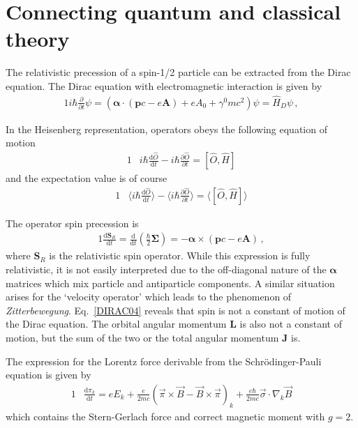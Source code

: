 \section{Connecting quantum and classical theory}
\label{sec:ehrenfest}
\noindent The relativistic precession of a spin-1/2 particle can be extracted from the Dirac equation. The Dirac equation with electromagnetic interaction is given by
\begin{alignat}{1}
  \label{DIRAC01} i\hbar\frac{\partial}{\partial t}\psi=\left(\boldsymbol{\alpha}\cdot\left(\mathbf{p}c-e\mathbf{A}\right)+eA_{0}+\gamma^{0}mc^{2}\right)\psi=\hat{H}_{D}\psi\,,
\end{alignat}

In the Heisenberg representation, operators obeys the following equation of motion
\begin{alignat}{1}
  \label{m06}		&i\hbar\frac{\mathrm{d}\hat{O}}{\mathrm{d}t}-i\hbar\frac{\partial\hat{O}}{\partial t}=[\hat{O},\hat{H}]
\end{alignat}
and the expectation value is of course
\begin{alignat}{1}
  \label{m07}		&\langle i\hbar\frac{\mathrm{d}\hat{O}}{\mathrm{d}t}\rangle-\langle i\hbar\frac{\partial\hat{O}}{\partial t}\rangle=\langle[\hat{O},\hat{H}]\rangle
\end{alignat}

The operator spin precession is
\begin{alignat}{1}
  \label{DIRAC04} \frac{\mathrm{d}\mathbf{S}_{R}}{\mathrm{d}t}=\frac{\mathrm{d}}{\mathrm{d}t}\left(\frac{\hbar}{2}\boldsymbol{\Sigma}\right)=-\boldsymbol{\alpha}\times\left(\mathbf{p}c-e\mathbf{A}\right)\,,
\end{alignat}
where $\mathbf{S}_{R}$ is the relativistic spin operator. While this expression is fully relativistic, it is not easily interpreted due to the off-diagonal nature of the $\boldsymbol{\alpha}$ matrices which mix particle and antiparticle components. A similar situation arises for the `velocity operator' which leads to the phenomenon of \emph{Zitterbewegung}. Eq.~\eqref{DIRAC04} reveals that spin is not a constant of motion of the Dirac equation. The orbital angular momentum $\mathbf{L}$ is also not a constant of motion, but the sum of the two or the total angular momentum $\mathbf{J}$ is.

The expression for the Lorentz force derivable from the Schr{\"o}dinger-Pauli equation is given by
\begin{alignat}{1}
  \label{m31}		&\frac{\mathrm{d}\pi_{k}}{\mathrm{d}t}=eE_{k}+\frac{e}{2mc}(\vec{\pi}\times\vec{B}-\vec{B}\times\vec{\pi})_{k}+\frac{e\hbar}{2mc}\vec{\sigma}\cdot\nabla_{k}\vec{B}
\end{alignat}
which contains the Stern-Gerlach force and correct magnetic moment with $g\!=\!2$.

